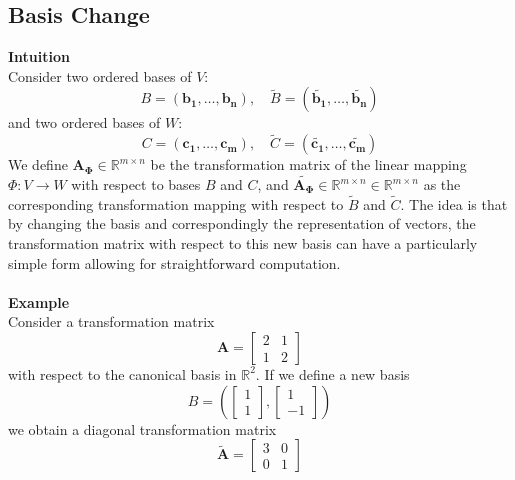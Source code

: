 \documentclass{report}
\begin{document}
\subsection{Basis Change} %
\label{fundamentals:basis change}
\textbf{Intuition}\\
Consider two ordered bases of $V$:
\begin{equation*}
B=(\bm{b_1,\ldots,b_n}),\quad\tilde{B}=(\bm{\tilde{b_1}},\ldots,\bm{\tilde{b_n}})
\end{equation*}
and two ordered bases of $W$:
\begin{equation*}
C=(\bm{c_1,\ldots,c_m}),\quad\tilde{C}=(\bm{\tilde{c_1}},\ldots,\bm{\tilde{c_m}})
\end{equation*}
We define $\bm{A_\Phi}\in\mathbb{R}^{m\times n}$ be the transformation matrix of the linear mapping 
$\Phi:V\rightarrow W$ with respect to bases $B$ and $C$, and 
$\tilde{\bm{A_\Phi}}\in\mathbb{R}^{m\times n}\in\mathbb{R}^{m\times n}$ as the corresponding 
transformation mapping with respect to $\tilde{B}$ and $\tilde{C}$. The idea is that by 
changing the basis and correspondingly the representation of vectors, the transformation
matrix with respect to this new basis can have a particularly simple form allowing for straightforward
computation.\\
\vspace{1mm}\\
\textbf{Example}\\
Consider a transformation matrix 
\begin{equation*}
\bm{A}=\begin{bmatrix}2&1\\1&2\end{bmatrix}
\end{equation*}
with respect to the canonical basis in $\mathbb{R}^2$. If we define a new basis
\begin{equation*}
B=\left(\begin{bmatrix}1\\1\end{bmatrix},\begin{bmatrix}1\\-1\end{bmatrix}\right)
\end{equation*}
we obtain a diagonal transformation matrix
\begin{equation*}
\tilde{\bm{A}}=\begin{bmatrix}3&0\\0&1\end{bmatrix}
\end{equation*}
\end{document}
